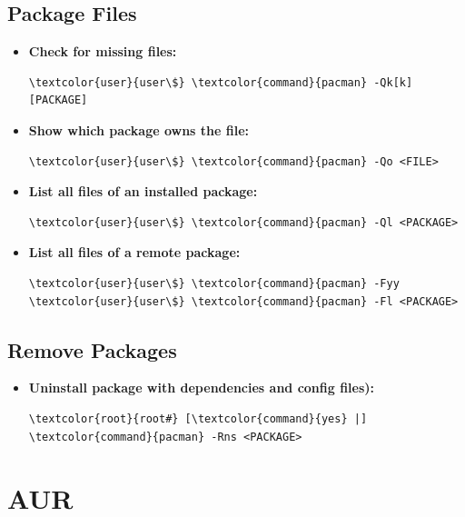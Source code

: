 \documentclass[10pt, a4paper, onecolumn, oneside, titlepage, openany]{book}
\begin{document}
\section{Package Files}
\begin{itemize}
    \item \textbf{Check for missing files:}
\begin{Verbatim}[commandchars=\\\{\}]
\textcolor{user}{user\$} \textcolor{command}{pacman} -Qk[k] [PACKAGE]
\end{Verbatim}
    \item \textbf{Show which package owns the file:}
\begin{Verbatim}[commandchars=\\\{\}]
\textcolor{user}{user\$} \textcolor{command}{pacman} -Qo <FILE>
\end{Verbatim}
    \item \textbf{List all files of an installed package:}
\begin{Verbatim}[commandchars=\\\{\}]
\textcolor{user}{user\$} \textcolor{command}{pacman} -Ql <PACKAGE>
\end{Verbatim}    
    \item \textbf{List all files of a remote package:}
\begin{Verbatim}[commandchars=\\\{\}]
\textcolor{user}{user\$} \textcolor{command}{pacman} -Fyy
\textcolor{user}{user\$} \textcolor{command}{pacman} -Fl <PACKAGE>
\end{Verbatim}    
\end{itemize}

\section{Remove Packages}
\begin{itemize}
    \item \textbf{Uninstall package with dependencies and config files):}
\begin{Verbatim}[commandchars=\\\{\}]
\textcolor{root}{root#} [\textcolor{command}{yes} |] \textcolor{command}{pacman} -Rns <PACKAGE>
\end{Verbatim}   
\end{itemize}


\chapter{AUR}
\label{AUR}
\end{document}
